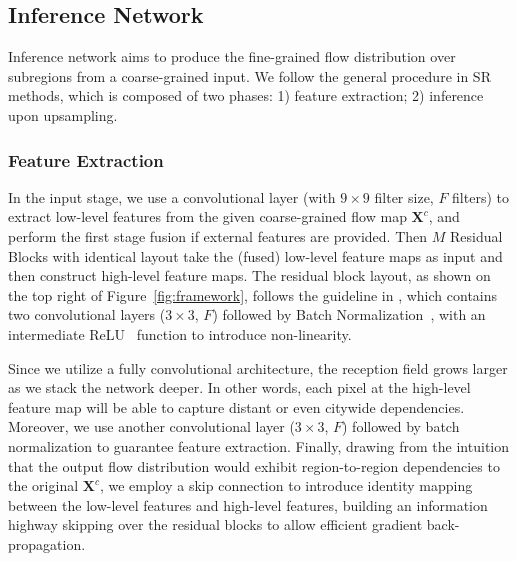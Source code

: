 \vspace{-1mm}
\subsection{Inference Network\label{sec:infnet}}
Inference network aims to produce the fine-grained flow distribution over subregions from a coarse-grained input. We follow the general procedure in SR methods, which is composed of two phases: 1) feature extraction; 2) inference upon upsampling.

\vspace{-1mm}
\subsubsection{Feature Extraction}
In the input stage, we use a convolutional layer (with $9\times 9$ filter size, $F$ filters) to extract low-level features from the given coarse-grained flow map $\mathbf{X}^c$, and perform the first stage fusion if external features are provided. Then $M$ Residual Blocks with identical layout take the (fused) low-level feature maps as input and then construct high-level feature maps. The residual block layout, as shown on the top right of Figure~\ref{fig:framework}, follows the guideline in \cite{ledig2017srgan}, which contains two convolutional layers ($3 \times 3$, $F$) followed by Batch Normalization~\cite{ioffe2015batch}, with an intermediate ReLU~\cite{hahnloser2000digital} function to introduce non-linearity.

Since we utilize a fully convolutional architecture, the reception field grows larger as we stack the network deeper. In other words, each pixel at the high-level feature map will be able to capture distant or even citywide dependencies. Moreover, we use another convolutional layer ($3\times 3$, $F$) followed by batch normalization to guarantee feature extraction. Finally, drawing from the intuition that the output flow distribution would exhibit region-to-region dependencies to the original $\mathbf{X}^c$, we employ a skip connection to introduce identity mapping~\cite{he2016identity} between the low-level features and high-level features, building an information highway skipping over the residual blocks to allow efficient gradient back-propagation.

\vspace{-1mm}
